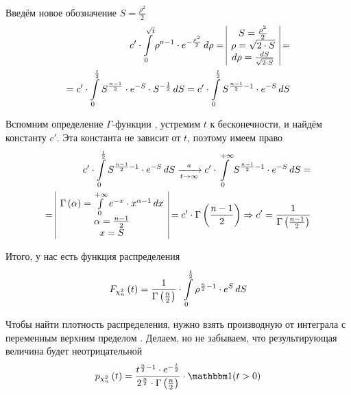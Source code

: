 Введём новое обозначение $S = \frac{\rho^2}{2}$
\begin{align*}
  c' \cdot \integral{0}{\sqrt{t}}{\rho}{
      \rho^{n-1} \cdot e^{- \frac{\rho^2}{2}}}
  = \begin{array}{|c|}
      S = \frac{\rho^2}{2} \\
      \rho = \sqrt{2 \cdot S} \\
      d\rho = \frac{dS}{\sqrt{2 \cdot S}}
  \end{array} = \\
  = c' \cdot \integral{0}{\frac{t}{2}}{S}{
      S^{\frac{n-1}{2}} \cdot e^{-S} \cdot S^{-\frac{1}{2}}}
  = c' \cdot \integral{0}{\frac{t}{2}}{S}{
      S^{\frac{n-1}{2} - 1} \cdot e^{-S}}
\end{align*}

Вспомним определение $\Gamma$-функции \cite[с.~416]{DorogovtsevMA}, устремим
$t$ к бесконечности, и найдём константу $c'$. Эта константа не зависит от
$t$, поэтому имеем право
\begin{align*}
  c' \cdot \integral{0}{\frac{t}{2}}{S}{
      S^{\frac{n-1}{2} - 1} \cdot e^{-S}}
  \covergencen{t}{a}
  c' \cdot \integral{0}{+\infty}{S}{
      S^{\frac{n-1}{2} - 1} \cdot e^{-S}} = \\
  = \begin{array}{|c|}
      \Gamma\left( \alpha \right)
      = \integral{0}{+\infty}{x}{e^{-x} \cdot x^{\alpha-1}} \\
      \alpha = \frac{n-1}{2} \\
      x = S
  \end{array}
  = c' \cdot \Gamma\left( \frac{n-1}{2} \right)
  \Rightarrow c' = \frac{1}{\Gamma\left( \frac{n-1}{2} \right)}
\end{align*}

Итого, у нас есть функция распределения
\begin{align*}
  \cdfof{\chi_n^2}{t}
  =  \frac{1}{\Gamma\left( \frac{n}{2} \right)} \cdot
      \integral{0}{\frac{t}{2}}{S}{\rho^{\frac{n}{2}-1} \cdot e^S}
\end{align*}

Чтобы найти плотность распределения, нужно взять производную от интеграла
с переменным верхним пределом \cite[с.~353]{IlinMA1}. Делаем, но не забываем,
что результирующая величина будет неотрицательной
\begin{align*}
  \pdfof{\chi_n^2}{t}
  = \frac{t^{\frac{n}{2}-1} \cdot e^{-\frac{t}{2}}}{
      2^{\frac{n}{2}} \cdot \Gamma\left( \frac{n}{2} \right)}
      \cdot \indicator{t>0}
\end{align*}

